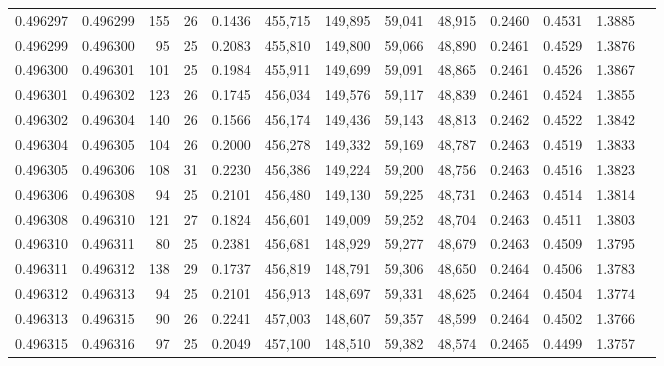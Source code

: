 \begin{tabular}{rrrrrrrrrrrrr}
0.496297 & 0.496299 & 155 &  26 &                                     0.1436 & 455,715 & 149,895 &  59,041 &  48,915 & 0.2460 & 0.4531 & 1.3885 \\
0.496299 & 0.496300 &  95 &  25 &                                     0.2083 & 455,810 & 149,800 &  59,066 &  48,890 & 0.2461 & 0.4529 & 1.3876 \\
0.496300 & 0.496301 & 101 &  25 &                                     0.1984 & 455,911 & 149,699 &  59,091 &  48,865 & 0.2461 & 0.4526 & 1.3867 \\
0.496301 & 0.496302 & 123 &  26 &                                     0.1745 & 456,034 & 149,576 &  59,117 &  48,839 & 0.2461 & 0.4524 & 1.3855 \\
0.496302 & 0.496304 & 140 &  26 &                                     0.1566 & 456,174 & 149,436 &  59,143 &  48,813 & 0.2462 & 0.4522 & 1.3842 \\
0.496304 & 0.496305 & 104 &  26 &                                     0.2000 & 456,278 & 149,332 &  59,169 &  48,787 & 0.2463 & 0.4519 & 1.3833 \\
0.496305 & 0.496306 & 108 &  31 &                                     0.2230 & 456,386 & 149,224 &  59,200 &  48,756 & 0.2463 & 0.4516 & 1.3823 \\
0.496306 & 0.496308 &  94 &  25 &                                     0.2101 & 456,480 & 149,130 &  59,225 &  48,731 & 0.2463 & 0.4514 & 1.3814 \\
0.496308 & 0.496310 & 121 &  27 &                                     0.1824 & 456,601 & 149,009 &  59,252 &  48,704 & 0.2463 & 0.4511 & 1.3803 \\
0.496310 & 0.496311 &  80 &  25 &                                     0.2381 & 456,681 & 148,929 &  59,277 &  48,679 & 0.2463 & 0.4509 & 1.3795 \\
0.496311 & 0.496312 & 138 &  29 &                                     0.1737 & 456,819 & 148,791 &  59,306 &  48,650 & 0.2464 & 0.4506 & 1.3783 \\
0.496312 & 0.496313 &  94 &  25 &                                     0.2101 & 456,913 & 148,697 &  59,331 &  48,625 & 0.2464 & 0.4504 & 1.3774 \\
0.496313 & 0.496315 &  90 &  26 &                                     0.2241 & 457,003 & 148,607 &  59,357 &  48,599 & 0.2464 & 0.4502 & 1.3766 \\
0.496315 & 0.496316 &  97 &  25 &                                     0.2049 & 457,100 & 148,510 &  59,382 &  48,574 & 0.2465 & 0.4499 & 1.3757 \\

\end{tabular}
